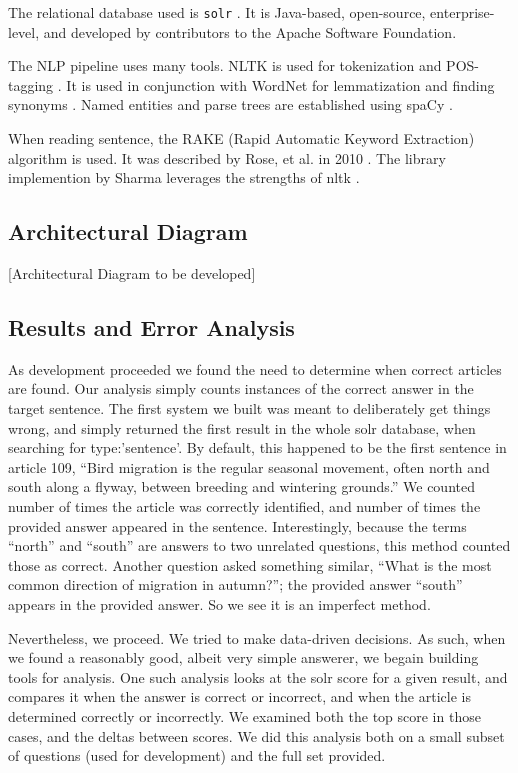 \documentclass[11pt]{article}
\begin{document}
The relational database used is \texttt{solr} \cite{solr}. It is Java-based, open-source, enterprise-level, and developed by contributors to the Apache Software Foundation.

The NLP pipeline uses many tools. NLTK is used for tokenization and POS-tagging \cite{nltk}. It is used in conjunction with WordNet for lemmatization and finding synonyms \cite{wordnet}. Named entities and parse trees are established using spaCy \cite{spacy2}.

When reading sentence, the RAKE (Rapid Automatic Keyword Extraction) algorithm is used. It was described by Rose, et al. in 2010 \cite{rake1}. The library implemention by Sharma leverages the strengths of nltk \cite{rake2}.


\subsection{Architectural Diagram}

[Architectural Diagram to be developed]

\subsection{Results and Error Analysis}

As development proceeded we found the need to determine when correct articles are found. Our analysis simply counts instances of the correct answer in the target sentence. The first system we built was meant to deliberately get things wrong, and simply returned the first result in the whole solr database, when searching for type:'sentence'. By default, this happened to be the first sentence in article 109, ``Bird migration is the regular seasonal movement, often north and south along a flyway, between breeding and wintering grounds.'' We counted number of times the article was correctly identified, and number of times the provided answer appeared in the sentence. Interestingly, because the terms ``north'' and ``south'' are answers to two unrelated questions, this method counted those as correct. Another question asked something similar, ``What is the most common direction of migration in autumn?''; the provided answer ``south'' appears in the provided answer. So we see it is an imperfect method.

Nevertheless, we proceed. We tried to make data-driven decisions. As such, when we found a reasonably good, albeit very simple answerer, we begain building tools for analysis. One such analysis looks at the solr score for a given result, and compares it when the answer is correct or incorrect, and when the article is determined correctly or incorrectly. We examined both the top score in those cases, and the deltas between scores. We did this analysis both on a small subset of questions (used for development) and the full set provided.
\end{document}
